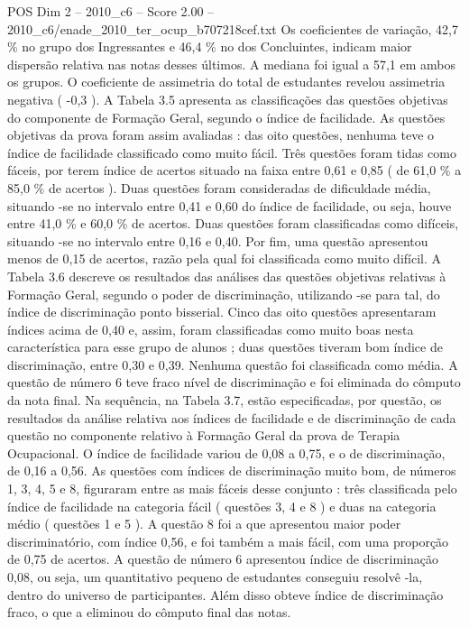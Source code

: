 \begin{textsample}{POS Dim 2 – 2010\_c6 – Score 2.00 – 2010\_c6/enade\_2010\_ter\_ocup\_b707218cef.txt}
Os coeficientes de variação, 42,7 \% no grupo dos Ingressantes e 46,4 \% no dos Concluintes, indicam maior dispersão relativa nas notas desses últimos.
A mediana foi igual a 57,1 em ambos os grupos.
O coeficiente de assimetria do total de estudantes revelou assimetria negativa ( -0,3 ).
A Tabela 3.5 apresenta as classificações das questões objetivas do componente de Formação Geral, segundo o índice de facilidade.
As questões objetivas da prova foram assim avaliadas : das oito questões, nenhuma teve o índice de facilidade classificado como muito fácil.
Três questões foram tidas como fáceis, por terem índice de acertos situado na faixa entre 0,61 e 0,85 ( de 61,0 \% a 85,0 \% de acertos ).
Duas questões foram consideradas de dificuldade média, situando -se no intervalo entre 0,41 e 0,60 do índice de facilidade, ou seja, houve entre 41,0 \% e 60,0 \% de acertos.
Duas questões foram classificadas como difíceis, situando -se no intervalo entre 0,16 e 0,40.
Por fim, uma questão apresentou menos de 0,15 de acertos, razão pela qual foi classificada como muito difícil.
A Tabela 3.6 descreve os resultados das análises das questões objetivas relativas à Formação Geral, segundo o poder de discriminação, utilizando -se para tal, do índice de discriminação ponto bisserial.
Cinco das oito questões apresentaram índices acima de 0,40 e, assim, foram classificadas como muito boas nesta característica para esse grupo de alunos ; duas questões tiveram bom índice de discriminação, entre 0,30 e 0,39.
Nenhuma questão foi classificada como média.
A questão de número 6 teve fraco nível de discriminação e foi eliminada do cômputo da nota final.
Na sequência, na Tabela 3.7, estão especificadas, por questão, os resultados da análise relativa aos índices de facilidade e de discriminação de cada questão no componente relativo à Formação Geral da prova de Terapia Ocupacional.
O índice de facilidade variou de 0,08 a 0,75, e o de discriminação, de 0,16 a 0,56.
As questões com índices de discriminação muito bom, de números 1, 3, 4, 5 e 8, figuraram entre as mais fáceis desse conjunto : três classificada pelo índice de facilidade na categoria fácil ( questões 3, 4 e 8 ) e duas na categoria médio ( questões 1 e 5 ).
A questão 8 foi a que apresentou maior poder discriminatório, com índice 0,56, e foi também a mais fácil, com uma proporção de 0,75 de acertos.
A questão de número 6 apresentou índice de discriminação 0,08, ou seja, um quantitativo pequeno de estudantes conseguiu resolvê -la, dentro do universo de participantes.
Além disso obteve índice de discriminação fraco, o que a eliminou do cômputo final das notas.

\end{textsample}
